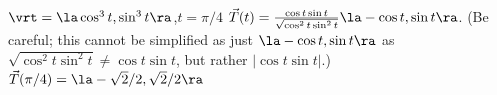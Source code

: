 {$\vrt = \la \cos^3t,\sin^3 t\ra$,\quad $t=\pi/4$
}
{$\vec T(t) = \frac{\cos t\sin t}{\sqrt{\cos^2t\sin^2t}}\la -\cos t,\sin t\ra$. (Be careful; this cannot be simplified as just $\la -\cos t,\sin t\ra$ as $\sqrt{\cos^2t\sin^2t}\neq \cos t\sin t$, but rather $|\cos t\sin t|$.)
$\vec T(\pi/4) = \la -\sqrt{2}/2,\sqrt{2}/2\ra$
}